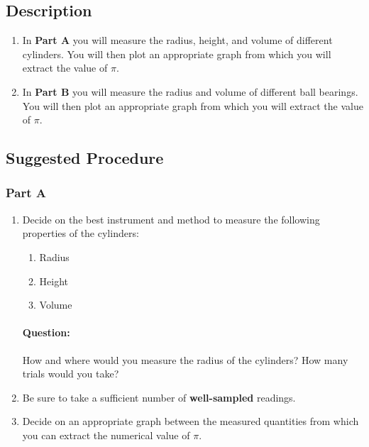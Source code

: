 \subsection{Description}

\begin{enumerate}
    \item In \textbf{Part A} you will measure the radius, height, and volume of different cylinders. You will then plot an appropriate graph from which you will extract the value of $\pi$.
    
    \item In \textbf{Part B} you will measure the radius and volume of different ball bearings. You will then plot an appropriate graph from which you will extract the value of $\pi$.
    
\end{enumerate}

\subsection{Suggested Procedure}

\subsubsection{Part A}

\begin{enumerate}
    \item Decide on the best instrument and method to measure the following properties of the cylinders:
    \begin{enumerate}
        \item Radius
        \item Height
        \item Volume
    \end{enumerate}
    
    \begin{question}
        \paragraph{Question:} How and where would you measure the radius of the cylinders? How many trials would you take?
    \end{question}
    
    \item Be sure to take a sufficient number of \textbf{well-sampled} readings.
    
    \item Decide on an appropriate graph between the measured quantities from which you can extract the numerical value of $\pi$.
\end{enumerate}

